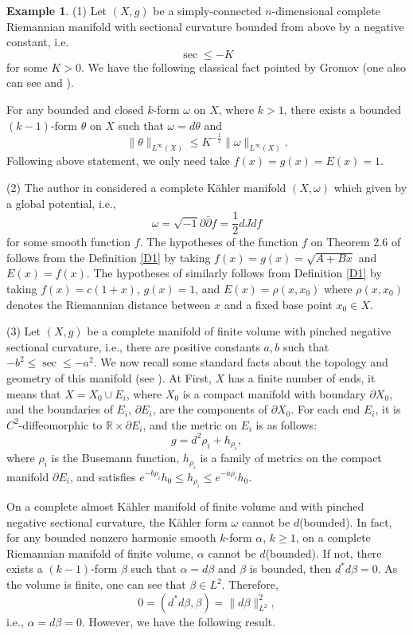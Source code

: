 \documentclass[12pt, twoside]{article}
\theoremstyle{definition}
\newtheorem{example}[theorem]{Example}
\numberwithin{equation}{section}
\def \a {\alpha }
\def \b {\beta}
\def\w {\omega}
\def\pa{\partial}
\begin{document}
	\begin{example}
		(1)	Let $(X,g)$ be a simply-connected $n$-dimensional complete Riemannian manifold with sectional curvature bounded from above by a negative constant, i.e.
		$$\sec\leq-K$$
		for some $K>0$. We have the following classical fact pointed by Gromov \cite{Gro} (one also can see \cite[Proposition 8.4]{Bal} and \cite[Lemma 3.2]{CY}).
		
		For any bounded and closed $k$-form $\w$ on $X$, where $k>1$, there exists a bounded $(k-1)$-form $\theta$ on $X$ such that $\w=d\theta$ and 
		$$\|\theta\|_{L^{\infty}(X)}\leq K^{-\frac{1}{2}}\|\w\|_{L^{\infty}(X)}.$$
		Following above statement, we only need take $f(x)=g(x)=E(x)=1$.

		(2) The author in \cite{McN02} considered a complete K\"{a}hler manifold $(X,\w)$ which given by a global potential, i.e.,
		 $$\w=\sqrt{-1}\pa\bar{\pa} f=\frac{1}{2}dJd f$$
		for some smooth function $f$. The hypotheses of the function $f$ on Theorem 2.6 of \cite{McN02} follows from the Definition \ref{D1} 
		by taking $f(x)=g(x)=\sqrt{A+Bx}$ and $E(x)=f(x)$. The hypotheses of \cite[Theorem 2]{CF} similarly follows from Definition \ref{D1} by taking $f(x)=c(1+x)$, $g(x)=1$, and $E(x)=\rho(x,x_{0})$ where $\rho(x,x_{0})$ denotes the Riemannian distance between $x$ and a fixed base point $x_{0}\in X$. 
		
		(3) Let $(X,g)$ be a complete manifold of finite volume with pinched negative sectional curvature, i.e.,
		 there are positive constants $a,b$ such that $-b^{2}\leq \sec\leq -a^{2}$. 
		 We now  recall some standard facts about the topology and geometry of this manifold (see \cite{Ebe,HI,Yeg}). 
		 At First, $X$ has a finite number of ends, it means that $X=X_{0}\cup E_{i}$, 
		 where $X_{0}$ is a compact manifold with boundary $\pa X_{0}$, and the boundaries of $E_{i}$, $\pa E_{i}$, 
		 are the components of $\pa X_{0}$. For each end $E_{i}$, it is $C^{2}$-diffeomorphic to $\mathbb{R}\times\pa E_{i}$, 
		 and the metric on $E_{i}$ is as follows:
        $$
		g=d^{2}\rho_{i}+h_{\rho_{i}},
		$$
		where $\rho_{i}$ is the Busemann function, $h_{\rho_{i}}$ is a family of metrics on the compact manifold $\pa E_{i}$, and satisfies
		$e^{-b\rho_{i}}h_{0}\leq h_{\rho_{i}}\leq e^{-a\rho_{i}}h_{0}$.
		
		On a complete almost K\"{a}hler manifold of finite volume and with pinched negative sectional curvature,
		 the K\"{a}hler form $\w$ cannot be $d$(bounded). In fact, for any bounded nonzero harmonic smooth $k$-form $\a$, $k\geq1$,
		  on a complete Riemannian manifold of finite volume, $\a$ cannot be $d$(bounded). 
		  If not, there exists a $(k-1)$-form $\b$ such that $\a=d\b$ and $\b$ is bounded, then $d^{\ast}d\b=0$. 
		  As the volume is finite, one can see that $\b\in L^{2}$. Therefore, 
		  $$0=(d^{\ast}d\b,\b)=\|d\b\|_{L^2}^{2},$$ 
		  i.e., $\a=d\b=0$. 
		  However, we have the following result. 


\end{example}
\end{document}
